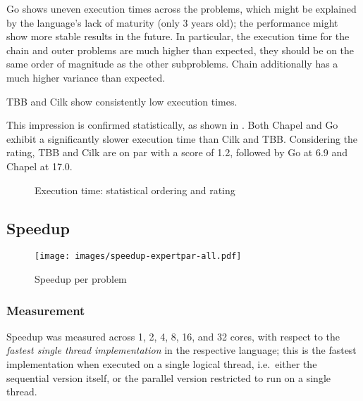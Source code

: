 Go shows uneven execution times across the problems, which might be explained by the language's lack of maturity (only 3 years old); the performance might show more stable results in the future. 
In particular, the execution time for the chain and outer problems are 
much higher than expected, 
they should be on the same order of magnitude as the other subproblems.
Chain additionally has a much higher variance than expected.

TBB and Cilk show consistently low execution times.

This impression is confirmed statistically, as shown in . Both Chapel and Go exhibit a significantly slower execution time than Cilk and TBB. Considering the rating, TBB and Cilk are on par with a score of 1.2, followed by Go at 6.9 and Chapel at 17.0.

\begin{figure}[htbp]
  \centering
  \vspace{-2ex}
  \caption{Execution time: statistical ordering and rating}
  \label{fig:ord:exectime}
\end{figure}

\subsection{Speedup}
\label{sec:speedup}

\begin{figure*}[htb]
  \centering
  \texttt{[image: images/speedup-expertpar-all.pdf]}
  \caption{Speedup per problem}
  \label{fig:speedup:problem}
\end{figure*}

\subsubsection{Measurement} Speedup was measured across 1, 2, 4, 8, 16, and 32 cores, with respect to the \emph{fastest single thread implementation} in the respective language; this is the fastest implementation when executed on a single logical thread, i.e.\ either the sequential version itself, or the parallel version restricted to run on a single thread. 




